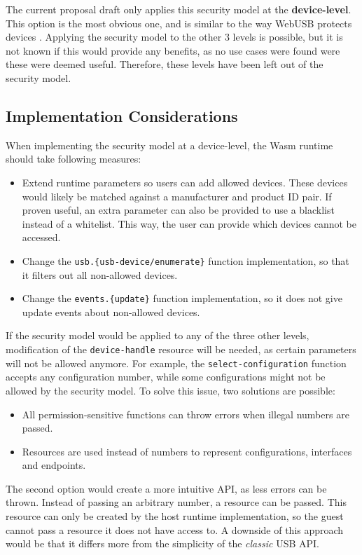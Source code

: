 The current proposal draft only applies this security model at the \textbf{device-level}. This option is the most obvious one, and is similar to the way WebUSB protects devices \cite{webusb_security}. Applying the security model to the other 3 levels is possible, but it is not known if this would provide any benefits, as no use cases were found were these were deemed useful. Therefore, these levels have been left out of the security model.

\subsection{Implementation Considerations}
When implementing the security model at a device-level, the \acrshort{Wasm} runtime should take following measures:
\begin{itemize}
\item Extend runtime parameters so users can add allowed devices. These devices would likely be matched against a manufacturer and product ID pair. If proven useful, an extra parameter can also be provided to use a blacklist instead of a whitelist. This way, the user can provide which devices cannot be accessed.
\item Change the \texttt{usb.\{usb-device/enumerate\}} function implementation, so that it filters out all non-allowed devices.
\item Change the \texttt{events.\{update\}} function implementation, so it does not give update events about non-allowed devices.
\end{itemize}

If the security model would be applied to any of the three other levels, modification of the \texttt{device-handle} resource will be needed, as certain parameters will not be allowed anymore. For example, the \texttt{select-configuration} function accepts any configuration number, while some configurations might not be allowed by the security model. To solve this issue, two solutions are possible:

\begin{itemize}
\item All permission-sensitive functions can throw errors when illegal numbers are passed.
\item Resources are used instead of numbers to represent configurations, interfaces and endpoints.
\end{itemize}

The second option would create a more intuitive API, as less errors can be thrown. Instead of passing an arbitrary number, a resource can be passed. This resource can only be created by the host runtime implementation, so the guest cannot pass a resource it does not have access to. A downside of this approach would be that it differs more from the simplicity of the \textit{classic} \acrshort{USB} \acrshort{API}.

